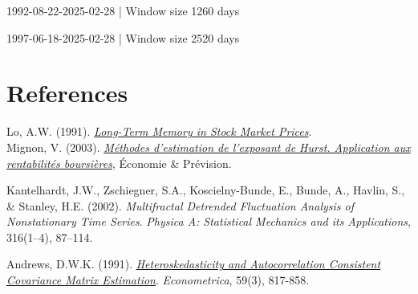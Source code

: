 \documentclass[11pt]{extarticle}
\begin{document}
\begin{table}[!h]
    \centering
    \caption{1992-08-22-2025-02-28 | Window size 1260 days}
    \label{tab:performance_table_window_1260}
\end{table}

\begin{table}[!h]
    \centering
    \caption{1997-06-18-2025-02-28 | Window size 2520 days}
    \label{tab:performance_table_window_2520}
\end{table}


\section{References}

Lo, A.W. (1991). \textit{\href{http://www.e-m-h.org/Lo\_\_91.pdf}{Long-Term Memory in Stock Market Prices}}. \\

Mignon, V. (2003). \textit{\href{https://www.persee.fr/doc/ecop_0249-4744_1998_num_132_1_5909}{Méthodes d'estimation de l'exposant de Hurst. Application aux rentabilités boursières}}, Économie \& Prévision.

Kantelhardt, J.W., Zschiegner, S.A., Koscielny-Bunde, E., Bunde, A., Havlin, S., \& Stanley, H.E. (2002). \textit{Multifractal Detrended Fluctuation Analysis of Nonstationary Time Series}. \textit{Physica A: Statistical Mechanics and its Applications}, 316(1--4), 87--114.

Andrews, D.W.K. (1991). \textit{\href{https://www.jstor.org/stable/2938229}{Heteroskedasticity and Autocorrelation Consistent Covariance Matrix Estimation}}. \textit{Econometrica}, 59(3), 817-858.
\end{document}
